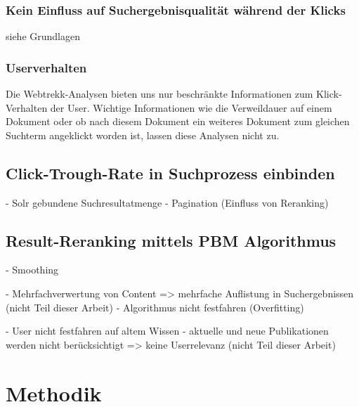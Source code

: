 \subsubsection{Kein Einfluss auf Suchergebnisqualität während der Klicks}
\label{sec:Reranking:Prozessaufbau:Click-Trough-Daten:Click-Trough-Suchergebnisqualität}

siehe Grundlagen

\subsubsection{Userverhalten}
\label{sec:Reranking:Prozessaufbau:Click-Trough-Daten:Click-Trough-Userverhalten}

Die Webtrekk-Analysen bieten uns nur beschränkte Informationen zum Klick-Verhalten der User. Wichtige Informationen wie die Verweildauer auf einem Dokument oder ob nach diesem Dokument ein weiteres Dokument zum gleichen Suchterm angeklickt worden ist, lassen diese Analysen nicht zu. 

\subsection{Click-Trough-Rate in Suchprozess einbinden}
\label{sec:Reranking:Prozessaufbau:SucheEinbinden}

- Solr gebundene Suchresultatmenge
- Pagination (Einfluss von Reranking)

\subsection{Result-Reranking mittels PBM Algorithmus}
\label{sec:Reranking:Prozessaufbau:Result-RerankingPBM}

- Smoothing

- Mehrfachverwertung von Content 
	=> mehrfache Auflistung in Suchergebnissen (nicht Teil dieser Arbeit)
- Algorithmus nicht festfahren (Overfitting)

- User nicht festfahren auf altem Wissen 
	- aktuelle und neue Publikationen werden nicht berücksichtigt 
		=> keine Userrelevanz (nicht Teil dieser Arbeit)
		

\section{Methodik}
\label{sec:Reranking:Methodik}

